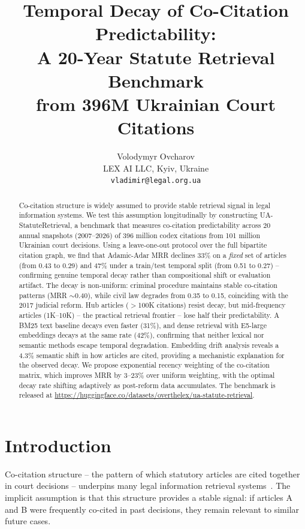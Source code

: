 \documentclass[11pt]{article}
\title{Temporal Decay of Co-Citation Predictability:\\A 20-Year Statute Retrieval Benchmark\\from 396M Ukrainian Court Citations}
\author{
  Volodymyr Ovcharov \\[6pt]
  LEX AI LLC, Kyiv, Ukraine \\[4pt]
  \texttt{vladimir@legal.org.ua}
}
\date{}
\begin{document}
\maketitle

\begin{abstract}
Co-citation structure is widely assumed to provide stable retrieval signal in legal information systems.
We test this assumption longitudinally by constructing UA-StatuteRetrieval, a benchmark that measures co-citation predictability across 20 annual snapshots (2007--2026) of 396 million codex citations from 101 million Ukrainian court decisions.
Using a leave-one-out protocol over the full bipartite citation graph, we find that Adamic-Adar MRR declines 33\% on a \emph{fixed} set of articles (from 0.43 to 0.29) and 47\% under a train/test temporal split (from 0.51 to 0.27) -- confirming genuine temporal decay rather than compositional shift or evaluation artifact.
The decay is non-uniform: criminal procedure maintains stable co-citation patterns (MRR $\sim$0.40), while civil law degrades from 0.35 to 0.15, coinciding with the 2017 judicial reform.
Hub articles ($>$100K citations) resist decay, but mid-frequency articles (1K--10K) -- the practical retrieval frontier -- lose half their predictability.
A BM25 text baseline decays even faster (31\%), and dense retrieval with E5-large embeddings decays at the same rate (42\%), confirming that neither lexical nor semantic methods escape temporal degradation.
Embedding drift analysis reveals a 4.3\% semantic shift in how articles are cited, providing a mechanistic explanation for the observed decay.
We propose exponential recency weighting of the co-citation matrix, which improves MRR by 3--23\% over uniform weighting, with the optimal decay rate shifting adaptively as post-reform data accumulates.
The benchmark is released at \url{https://huggingface.co/datasets/overthelex/ua-statute-retrieval}.
\end{abstract}

\section{Introduction}
\label{sec:intro}

Co-citation structure -- the pattern of which statutory articles are cited together in court decisions -- underpins many legal information retrieval systems~\citep{tang2024casegnn,ho2025incorporating,barron2025bridging}.
The implicit assumption is that this structure provides a stable signal: if articles A and B were frequently co-cited in past decisions, they remain relevant to similar future cases.
\end{document}
